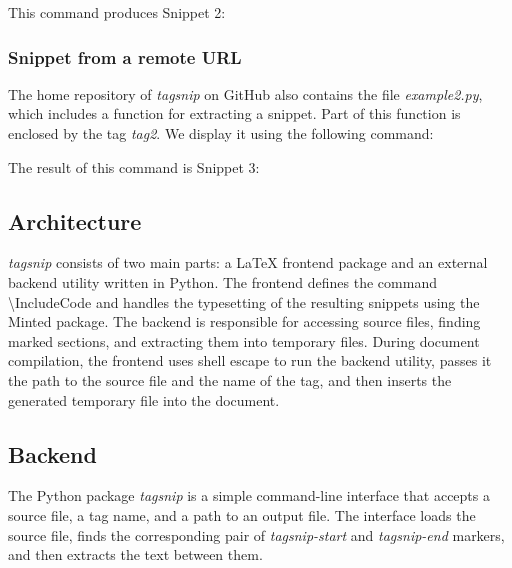 \documentclass{article}
\begin{document}

This command produces Snippet 2:


\newpage

\subsubsection*{Snippet from a remote URL}

The home repository of \textit{tagsnip} on GitHub also contains the file \textit{example2.py}, 
which includes a function for extracting a snippet. 
Part of this function is enclosed by the tag \textit{tag2}. 
We display it using the following command:


The result of this command is Snippet 3:


\subsection*{Architecture}

\textit{tagsnip} consists of two main parts: a La\TeX{} frontend package and an external backend utility written in Python. 
The frontend defines the command \textbackslash{}IncludeCode and handles the typesetting of the resulting snippets 
using the Minted package. The backend is responsible for accessing source files, finding marked sections, 
and extracting them into temporary files. During document compilation, the frontend uses shell escape 
to run the backend utility, passes it the path to the source file and the name of the tag, 
and then inserts the generated temporary file into the document.

\subsection*{Backend}

The Python package \textit{tagsnip} is a simple command-line interface that accepts a source file, 
a tag name, and a path to an output file. The interface loads the source file, 
finds the corresponding pair of \textit{tagsnip-start} and \textit{tagsnip-end} markers, 
and then extracts the text between them.
\end{document}
